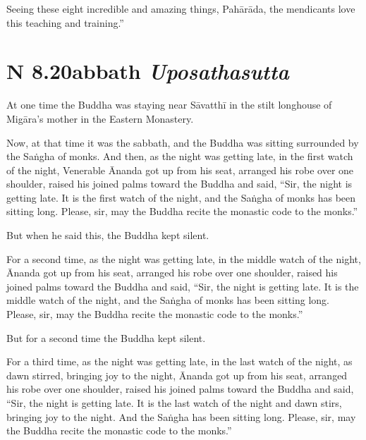 \documentclass[12pt,openany]{book}%
\newcommand*{\suttatitleacronym}[1]{\smaller[2]{#1}\vspace*{.3em}}
\newcommand*{\suttatitletranslation}[1]{\linebreak{#1}}
\newcommand*{\suttatitleroot}[1]{\linebreak\smaller[2]\itshape{#1}}
\newcommand*{\tocacronym}[1]{\hspace*{-3.3em}{#1}\quad}
\newcommand*{\toctranslation}[1]{#1}
\newcommand*{\tocroot}[1]{(\textit{#1})}
\begin{document}
Seeing these eight incredible and amazing things, \textsanskrit{Pahārāda}, the mendicants love this teaching and training.” 

%
\section*{{\suttatitleacronym AN 8.20}{\suttatitletranslation Sabbath }{\suttatitleroot Uposathasutta}}
\addcontentsline{toc}{section}{\tocacronym{AN 8.20} \toctranslation{Sabbath } \tocroot{Uposathasutta}}

At one time the Buddha was staying near \textsanskrit{Sāvatthī} in the stilt longhouse of \textsanskrit{Migāra}’s mother in the Eastern Monastery. 

Now, at that time it was the sabbath, and the Buddha was sitting surrounded by the \textsanskrit{Saṅgha} of monks. And then, as the night was getting late, in the first watch of the night, Venerable Ānanda got up from his seat, arranged his robe over one shoulder, raised his joined palms toward the Buddha and said, “Sir, the night is getting late. It is the first watch of the night, and the \textsanskrit{Saṅgha} of monks has been sitting long. Please, sir, may the Buddha recite the monastic code to the monks.” 

But when he said this, the Buddha kept silent. 

For a second time, as the night was getting late, in the middle watch of the night, Ānanda got up from his seat, arranged his robe over one shoulder, raised his joined palms toward the Buddha and said, “Sir, the night is getting late. It is the middle watch of the night, and the \textsanskrit{Saṅgha} of monks has been sitting long. Please, sir, may the Buddha recite the monastic code to the monks.” 

But for a second time the Buddha kept silent. 

For a third time, as the night was getting late, in the last watch of the night, as dawn stirred, bringing joy to the night, Ānanda got up from his seat, arranged his robe over one shoulder, raised his joined palms toward the Buddha and said, “Sir, the night is getting late. It is the last watch of the night and dawn stirs, bringing joy to the night. And the \textsanskrit{Saṅgha} has been sitting long. Please, sir, may the Buddha recite the monastic code to the monks.” 
\end{document}
